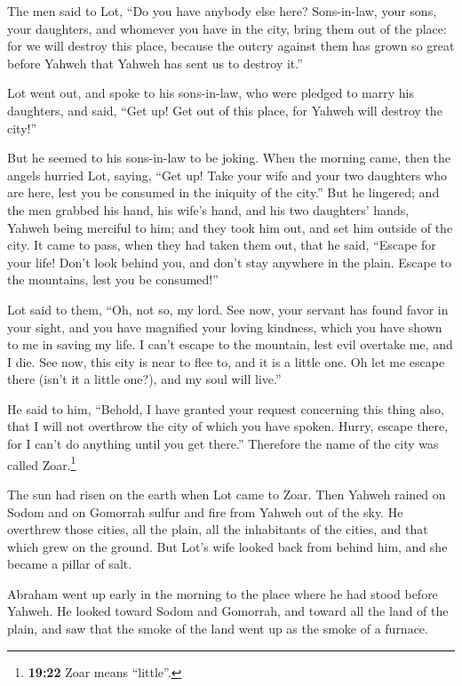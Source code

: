  The men said to Lot, ``Do you have anybody else here?
Sons-in-law, your sons, your daughters, and whomever you have in the
city, bring them out of the place:  for we will destroy
this place, because the outcry against them has grown so great before
Yahweh that Yahweh has sent us to destroy it.''

 Lot went out, and spoke to his sons-in-law, who were
pledged to marry his daughters, and said, ``Get up! Get out of this
place, for Yahweh will destroy the city!''

But he seemed to his sons-in-law to be joking.  When the
morning came, then the angels hurried Lot, saying, ``Get up! Take your
wife and your two daughters who are here, lest you be consumed in the
iniquity of the city.''  But he lingered; and the men
grabbed his hand, his wife's hand, and his two daughters' hands, Yahweh
being merciful to him; and they took him out, and set him outside of the
city.  It came to pass, when they had taken them out,
that he said, ``Escape for your life! Don't look behind you, and don't
stay anywhere in the plain. Escape to the mountains, lest you be
consumed!''

 Lot said to them, ``Oh, not so, my lord. 
See now, your servant has found favor in your sight, and you have
magnified your loving kindness, which you have shown to me in saving my
life. I can't escape to the mountain, lest evil overtake me, and I die.
 See now, this city is near to flee to, and it is a
little one. Oh let me escape there (isn't it a little one?), and my soul
will live.''

 He said to him, ``Behold, I have granted your request
concerning this thing also, that I will not overthrow the city of which
you have spoken.  Hurry, escape there, for I can't do
anything until you get there.'' Therefore the name of the city was
called Zoar.\footnote{\textbf{19:22} Zoar means ``little''.}

 The sun had risen on the earth when Lot came to Zoar.
 Then Yahweh rained on Sodom and on Gomorrah sulfur and
fire from Yahweh out of the sky.  He overthrew those
cities, all the plain, all the inhabitants of the cities, and that which
grew on the ground.  But Lot's wife looked back from
behind him, and she became a pillar of salt.

 Abraham went up early in the morning to the place where
he had stood before Yahweh.  He looked toward Sodom and
Gomorrah, and toward all the land of the plain, and saw that the smoke
of the land went up as the smoke of a furnace.

